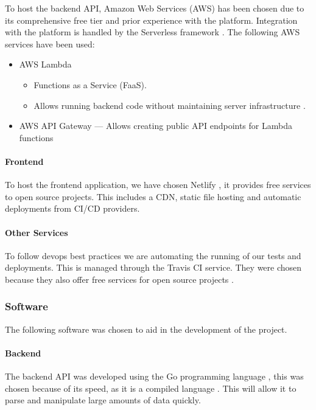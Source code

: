 \documentclass[a4paper,11pt]{article}
\begin{document}
To host the backend API, Amazon Web Services (AWS) has been chosen due to its
comprehensive free tier and prior experience with the platform. Integration with
the platform is handled by the Serverless framework \autocite{serverless:3}. The
following AWS services have been used:

\begin{itemize}
  \item AWS Lambda
    \begin{itemize}
      \item Functions as a Service (FaaS).
      \item Allows running backend code without maintaining server
        infrastructure \autocite{aws:4}.
    \end{itemize}
  \item AWS API Gateway --- Allows creating public API endpoints for Lambda
    functions \autocite{aws:5}
\end{itemize}

\paragraph{Frontend}

To host the frontend application, we have chosen Netlify \autocite{netlify:6},
it provides free services to open source projects. This includes a CDN, static
file hosting and automatic deployments from CI/CD providers.

\paragraph{Other Services}

To follow devops best practices we are automating the running of our tests
and deployments. This is managed through the Travis CI service. They were
chosen because they also offer free services for open source projects
\autocite{trci:7}.

\subsubsection{Software}

The following software was chosen to aid in the development of the project.

\paragraph{Backend}

The backend API was developed using the Go programming language
\autocite{go:8}, this was chosen because of its speed, as it is a compiled
language \autocite{plural:9}. This will allow it to parse and manipulate large
amounts of data quickly.
\end{document}

